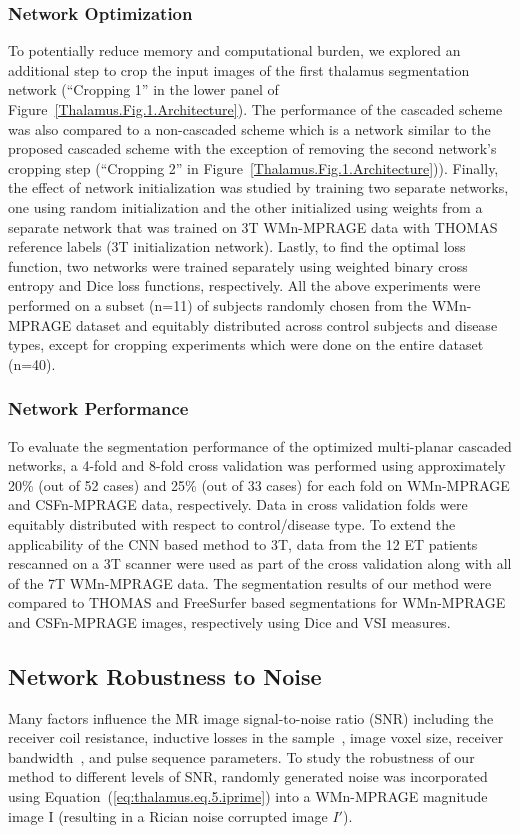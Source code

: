 \subsubsection{Network Optimization}
To potentially reduce memory and computational burden, we explored an additional step to crop the input images of the first thalamus segmentation network (``Cropping 1'' in the lower panel of Figure~\ref{Thalamus.Fig.1.Architecture}). The performance of the cascaded scheme was also compared to a non-cascaded scheme which is a network similar to the proposed cascaded scheme with the exception of removing the second network's cropping step (``Cropping 2'' in Figure~\ref{Thalamus.Fig.1.Architecture})). Finally, the effect of network initialization was studied by training two separate networks, one using random initialization and the other initialized using weights from a separate network that was trained on 3T WMn-MPRAGE data with THOMAS reference labels (3T initialization network). Lastly, to find the optimal loss function, two networks were trained separately using weighted binary cross entropy and Dice loss functions, respectively. All the above experiments were performed on a subset (n=11) of subjects randomly chosen from the WMn-MPRAGE dataset and equitably distributed across control subjects and disease types, except for cropping experiments which were done on the entire dataset (n=40).

\subsubsection{Network Performance}
To evaluate the segmentation performance of the optimized multi-planar cascaded networks, a 4-fold and 8-fold cross validation was performed using approximately 20\% (out of 52 cases) and 25\% (out of 33 cases) for each fold on WMn-MPRAGE and CSFn-MPRAGE data, respectively. Data in cross validation folds were equitably distributed with respect to control/disease type. To extend the applicability of the CNN based method to 3T, data from the 12 ET patients rescanned on a 3T scanner were used as part of the cross validation along with all of the 7T WMn-MPRAGE data. The segmentation results of our method were compared to THOMAS and FreeSurfer based segmentations for WMn-MPRAGE and CSFn-MPRAGE images, respectively using Dice and VSI measures.

\subsection{Network Robustness to Noise}
Many factors influence the MR image signal-to-noise ratio (SNR) including the receiver coil resistance, inductive losses in the sample~\cite{hoult_Sensitivity_1979}, image voxel size, receiver bandwidth~\cite{edelstein_Intrinsic_1986}, and pulse sequence parameters. To study the robustness of our method to different levels of SNR, randomly generated noise was incorporated using Equation~(\ref{eq:thalamus.eq.5.iprime}) into a WMn-MPRAGE magnitude image I (resulting in a Rician noise corrupted image $I'$).

